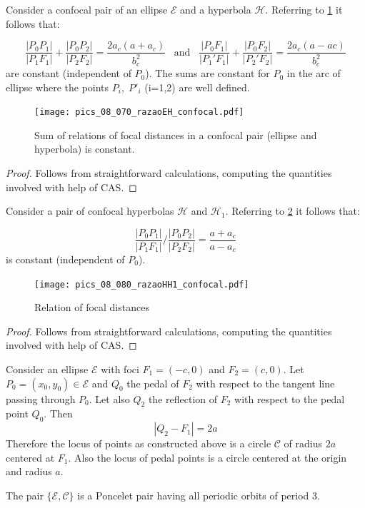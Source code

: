 \begin{proposition}
	Consider a confocal pair of an ellipse  $\mathcal{E}$ and a hyperbola $\mathcal{H}$. Referring to   \cref{fig:dEH} it follows that:
	
	\[\frac{|P_0P_1|}{|P_1F_1|}+\frac{|P_0P_2|}{|P_2F_2|}=\frac{2a_c(a+a_c)}{b_c^2}\;\;\; \text{and}\;\;\; \frac{|P_0F_1|}{|P_1'F_1|}+\frac{|P_0F_2|}{|P_2'F_2|}= \frac{2a_c(a-ac)}{b_c^2}\]
	are constant (independent of $P_0$).
 The sums  are constant for $P_0$ in the arc of ellipse  where the points $P_i,\; P'_i$ (i=1,2) are well defined.
\end{proposition}
\begin{figure}[H]
	\begin{center}
 \texttt{[image:  pics\_08\_070\_razaoEH\_confocal.pdf]}
		\caption { Sum of relations of focal distances in a confocal pair (ellipse and hyperbola) is constant.  }
		\label{fig:dEH}
	\end{center}
\end{figure}
\begin{proof}
Follows from straightforward calculations, computing the quantities involved with help of CAS. 
\end{proof}
\begin{proposition}
	Consider a pair of confocal hyperbolas $\mathcal{H}$ and $\mathcal{H}_1$. Referring to   \cref{fig:dHH} it follows that:
	
	\[\frac{|P_0P_1|}{|P_1F_1|}/\frac{|P_0P_2|}{|P_2F_2|}=\frac{a+a_c}{a-a_c}\]
	is constant (independent of $P_0$).
	
\end{proposition}
\begin{figure}[H]
	\begin{center}
	 	 \texttt{[image:  pics\_08\_080\_razaoHH1\_confocal.pdf]}
		\caption { Relation of focal distances  }
		\label{fig:dHH}
	\end{center}
\end{figure}
\begin{proof}
Follows from straightforward calculations, computing the quantities involved with help of CAS. 
\end{proof}


\begin{proposition} \label{prop:pedal_circle} Consider an ellipse $\mathcal{E}$  with foci $F_1=(-c,0)$ and $F_2=(c,0)$. Let $P_0=(x_0,y_0)\in\mathcal{E}$ and $Q_0$ the pedal of $F_2$ with respect to the tangent line passing through $P_0$. Let also $Q_2$ the reflection of $F_2$ with respect to the pedal point $Q_0$.
	Then \[ |Q_2-F_1|=2a\]
	Therefore the locus of points as constructed above is a circle $\mathcal{C}$  of radius $2a$ centered at $F_1$.
	Also the locus of pedal points is a circle centered at the origin and radius $a$.
	
	The pair $\{\mathcal{E},\mathcal{C}\}$ is a Poncelet pair having all periodic orbits of period 3.
\end{proposition}

